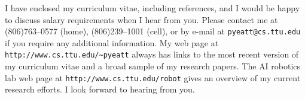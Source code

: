 I have enclosed my curriculum vitae, including references, and
I would be happy to discuss salary requirements when I hear
from you.
Please contact me at (806)763--0577 (home), (806)239--1001
(cell), or by e-mail at {\verb!pyeatt@cs.ttu.edu!} if you require any
additional information.  My web page at
\verb!http://www.cs.ttu.edu/~pyeatt!
always has links to the most recent version of my curriculum vitae and a
broad sample of my research papers. The AI robotics lab web page at
\verb!http://www.cs.ttu.edu/robot! gives an overview of my current
research efforts.  I look forward to hearing from you.



